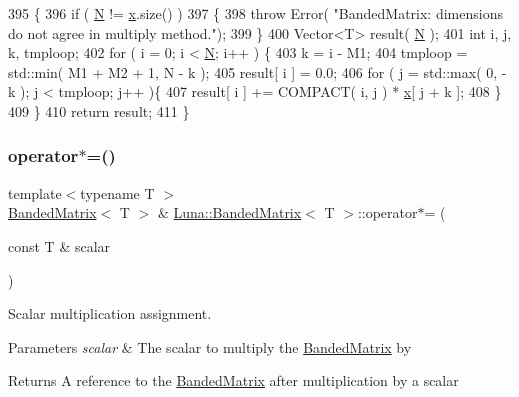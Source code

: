 \begin{DoxyCode}
395   \{
396     \textcolor{keywordflow}{if} ( \hyperlink{namespaceHeat__plot_a7d050092798e28458a263710837bda77}{N} != \hyperlink{namespaceHeat__plot_aa88370c16b85b784ccbde3ed88bc1991}{x}.size() )
397     \{
398       \textcolor{keywordflow}{throw} Error( \textcolor{stringliteral}{"BandedMatrix: dimensions do not agree in multiply method."});
399     \}
400     Vector<T> result( \hyperlink{namespaceHeat__plot_a7d050092798e28458a263710837bda77}{N} );
401     \textcolor{keywordtype}{int} i, j, k, tmploop;
402     \textcolor{keywordflow}{for} ( i = 0; i < \hyperlink{namespaceHeat__plot_a7d050092798e28458a263710837bda77}{N}; i++ ) \{
403         k = i - M1;
404         tmploop = std::min( M1 + M2 + 1, N - k );
405         result[ i ] = 0.0;
406         \textcolor{keywordflow}{for} ( j = std::max( 0, - k ); j < tmploop; j++ )\{
407         result[ i ] += COMPACT( i, j ) * \hyperlink{namespaceHeat__plot_aa88370c16b85b784ccbde3ed88bc1991}{x}[ j + k ];
408       \}
409     \}
410     \textcolor{keywordflow}{return} result;
411   \}
\end{DoxyCode}
\mbox{\label{classLuna_1_1BandedMatrix_aa6f7d004e260feb4dc20ed09692598f1}} 
\subsubsection{\texorpdfstring{operator$\ast$=()}{operator*=()}}
{\footnotesize\ttfamily template$<$typename T $>$ \\
\hyperlink{classLuna_1_1BandedMatrix}{Banded\+Matrix}$<$ T $>$ \& \hyperlink{classLuna_1_1BandedMatrix}{Luna\+::\+Banded\+Matrix}$<$ T $>$\+::operator$\ast$= (\begin{DoxyParamCaption}\item[{const T \&}]{scalar }\end{DoxyParamCaption})\hspace{0.3cm}{\ttfamily [inline]}}



Scalar multiplication assignment. 


\begin{DoxyParams}{Parameters}
{\em scalar} & The scalar to multiply the \hyperlink{classLuna_1_1BandedMatrix}{Banded\+Matrix} by \\
\hline
\end{DoxyParams}
\begin{DoxyReturn}{Returns}
A reference to the \hyperlink{classLuna_1_1BandedMatrix}{Banded\+Matrix} after multiplication by a scalar 
\end{DoxyReturn}


